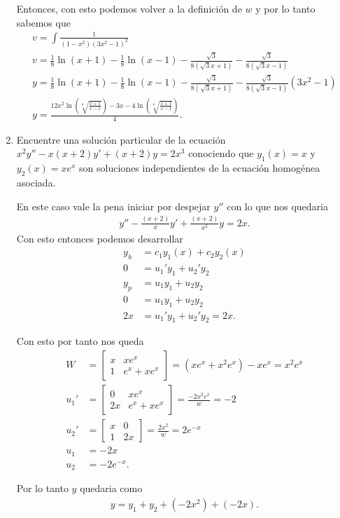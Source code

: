 \begin{enumerate}
	Entonces, con esto podemos volver a la definición de $w$ y por lo tanto sabemos que
	\begin{align*}
	  v = \int \frac{1}{\left( 1-x^2 \right) \left( 3x^2-1 \right)^2}\\
	  v = \frac{1}{8}\ln\left( x+1 \right) - \frac{1}{8}\ln\left( x-1 \right) - \frac{\sqrt{3} }{8\left( \sqrt{3} x+1 \right) }-\frac{\sqrt{3} }{8\left( \sqrt{3} x-1 \right) }\\
	  y = \frac{1}{8}\ln\left( x+1 \right) - \frac{1}{8}\ln\left( x-1 \right) - \frac{\sqrt{3} }{8\left( \sqrt{3} x+1 \right) }-\frac{\sqrt{3} }{8\left( \sqrt{3} x-1 \right) }\left( 3x^2-1 \right) \\
	  y = \frac{12x^2\ln\left( \sqrt[8]{\frac{x+1}{x-1}}  \right) -3x-4\ln\left( \sqrt[8]{\frac{x+1}{x-1}}  \right) }{4}
	.\end{align*}
      \item Encuentre una solución particular de la ecuación $x^2y''-x\left( x+2 \right)y'+\left( x+2 \right)y=2x^3$ conociendo que $y_1\left( x \right) = x$ y $y_2\left( x \right) = xe^{x}$ son soluciones independientes de la ecuación homogénea asociada.

	En este caso vale la pena iniciar por despejar $y''$ con lo que nos quedaria
	\begin{align*}
	  y'' - \frac{\left( x+2 \right) }{x} y' + \frac{\left( x+2 \right) }{x^2}y=2x
	.\end{align*}
	Con esto entonces podemos desarrollar
	\begin{align*}
	  y_h &= c_1y_1\left( x \right) + c_2y_2\left( x \right) \\
	  0 &=  u_1'y_1+u_2'y_2\\
	  y_p &= u_1y_1+u_2y_2 \\
	  0 &= u_1y_1+u_2y_2 \\
	  2x &= u_1'y_1+u_{2}'y_2=2x
	.\end{align*}

	Con esto por tanto nos queda 
	\begin{align*}
	  W &= \begin{bmatrix} x & xe^{x}\\ 1 & e^{x}+xe^{x} \end{bmatrix} = \left( xe^{x}+x^2e^{x} \right) - xe^{x}= x^2e^{x}\\
	  u_1' &= \begin{bmatrix} 0 & xe^{x} \\ 2x & e^{x}+xe^{x} \end{bmatrix} = \frac{-2x^2e^{x}}{w}=-2\\
	  u_2' &= \begin{bmatrix} x & 0 \\ 1 & 2x \end{bmatrix} = \frac{2x^2}{w}=2e^{-x} \\
	  u_1 &= -2x \\
	  u_2 &= -2e^{-x}
	.\end{align*}

	Por lo tanto $y$ quedaria como
	\begin{align*}
	  y = y_1 + y_2 + \left( -2x^2 \right) + \left( -2x \right) 
	.\end{align*}
    \end{enumerate}

